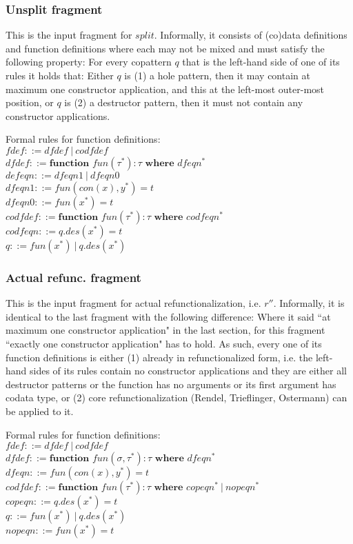 \documentclass[11pt]{article} %
\begin{document}
\subsubsection{Unsplit fragment}

This is the input fragment for $split$. Informally, it consists of (co)data definitions and function definitions where each may not be mixed and must satisfy the following property: For every copattern $q$ that is the left-hand side of one of its rules it holds that: Either $q$ is (1) a hole pattern, then it may contain at maximum one constructor application, and this at the left-most outer-most position, or $q$ is (2) a destructor pattern, then it must not contain any constructor applications.

Formal rules for function definitions:\\
$fdef ::= dfdef ~ | ~ codfdef$\\
$dfdef ::= \textbf{function } fun(\tau^*): \tau \textbf{ where } dfeqn^*$\\
$defeqn ::= dfeqn1 ~ | ~ dfeqn0$\\
$dfeqn1 ::= fun(con(x), y^*) = t$\\
$dfeqn0 ::= fun(x^*) = t$\\
$codfdef ::= \textbf{function } fun(\tau^*): \tau \textbf{ where } codfeqn^*$\\
$codfeqn ::= q.des(x^*) = t$\\
$q ::= fun(x^*) ~ | ~ q.des(x^*)$

\subsubsection{Actual refunc. fragment}

This is the input fragment for actual refunctionalization, i.e. $r''$. Informally, it is identical to the last fragment with the following difference: Where it said ``at maximum one constructor application" in the last section, for this fragment ``exactly one constructor application" has to hold. As such, every one of its function definitions is either (1) already in refunctionalized form, i.e. the left-hand sides of its rules contain no constructor applications and they are either all destructor patterns or the function has no arguments or its first argument has codata type, or (2) core refunctionalization (Rendel, Trieflinger, Ostermann) can be applied to it.

Formal rules for function definitions:\\
$fdef ::= dfdef ~ | ~ codfdef $\\
$dfdef ::= \textbf{function } fun(\sigma, \tau^*): \tau \textbf{ where } dfeqn^*$\\
$dfeqn ::= fun(con(x), y^*) = t$\\
$codfdef ::= \textbf{function } fun(\tau^*): \tau \textbf{ where } copeqn^* ~ | ~ nopeqn^*$\\
$copeqn ::= q.des(x^*) = t$\\
$q ::= fun(x^*) ~ | ~ q.des(x^*)$\\
$nopeqn ::= fun(x^*) = t$
\end{document}
